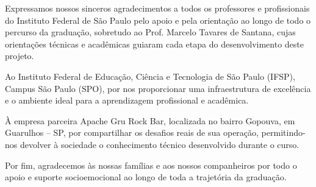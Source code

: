 \begin{agradecimentos}
Expressamos nossos sinceros agradecimentos a todos os professores e profissionais do Instituto Federal de São Paulo pelo apoio e pela orientação ao longo de todo o percurso da graduação, sobretudo ao Prof. Marcelo Tavares de Santana, cujas orientações técnicas e acadêmicas guiaram cada etapa do desenvolvimento deste projeto.

Ao Instituto Federal de Educação, Ciência e Tecnologia de São Paulo (IFSP), Campus São Paulo (SPO), por nos proporcionar uma infraestrutura de excelência e o ambiente ideal para a aprendizagem profissional e acadêmica.

À empresa parceira Apache Gru Rock Bar, localizada no bairro Gopouva, em Guarulhos -- SP, por compartilhar os desafios reais de sua operação, permitindo-nos devolver à sociedade o conhecimento técnico desenvolvido durante o curso.

Por fim, agradecemos às nossas famílias e aos nossos companheiros por todo o apoio e suporte socioemocional ao longo de toda a trajetória da graduação.
\end{agradecimentos}
